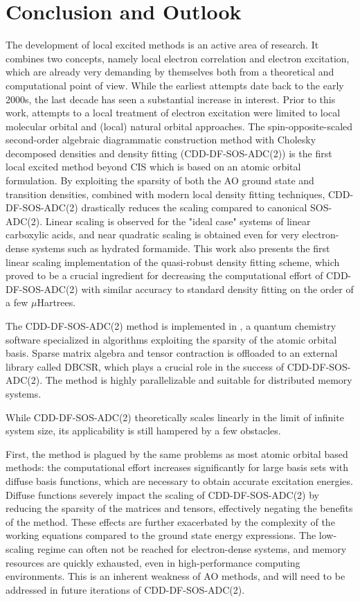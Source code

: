 \chapter{Conclusion and Outlook}

The development of local excited methods is an active area of research. It combines two concepts, namely local electron correlation and electron excitation, which are already very demanding by themselves both from a theoretical and computational point of view. While the earliest attempts date back to the early 2000s, the last decade has seen a substantial increase in interest. Prior to this work, attempts to a local treatment of electron excitation were limited to local molecular orbital and (local) natural orbital approaches. The spin-opposite-scaled second-order algebraic diagrammatic construction method with Cholesky decomposed densities and density fitting (CDD-DF-SOS-ADC(2)) is the first local excited method beyond CIS which is based on an atomic orbital formulation. By exploiting the sparsity of both the AO ground state and transition densities, combined with modern local density fitting techniques, CDD-DF-SOS-ADC(2) drastically reduces the scaling compared to canonical SOS-ADC(2). Linear scaling is observed for the "ideal case" systems of linear carboxylic acids, and near quadratic scaling is obtained even for very electron-dense systems such as hydrated formamide. This work also presents the first linear scaling implementation of the quasi-robust density fitting scheme, which proved to be a crucial ingredient for decreasing the computational effort of CDD-DF-SOS-ADC(2) with similar accuracy to standard density fitting on the order of a few $\mu$Hartrees. 

The CDD-DF-SOS-ADC(2) method is implemented in \mchem{}, a quantum chemistry software specialized in algorithms exploiting the sparsity of the atomic orbital basis. Sparse matrix algebra and tensor contraction is offloaded to an external library called DBCSR, which plays a crucial role in the success of CDD-DF-SOS-ADC(2). The method is highly parallelizable and suitable for distributed memory systems.

While CDD-DF-SOS-ADC(2) theoretically scales linearly in the limit of infinite system size, its applicability is still hampered by a few obstacles.

First, the method is plagued by the same problems as most atomic orbital based methods: the computational effort increases significantly for large basis sets with diffuse basis functions, which are necessary to obtain accurate excitation energies. Diffuse functions severely impact the scaling of CDD-DF-SOS-ADC(2) by reducing the sparsity of the matrices and tensors, effectively negating the benefits of the method. These effects are further exacerbated by the complexity of the working equations compared to the ground state energy expressions. The low-scaling regime can often not be reached for electron-dense systems, and memory resources are quickly exhausted, even in high-performance computing environments. This is an inherent weakness of AO methods, and will need to be addressed in future iterations of CDD-DF-SOS-ADC(2).

